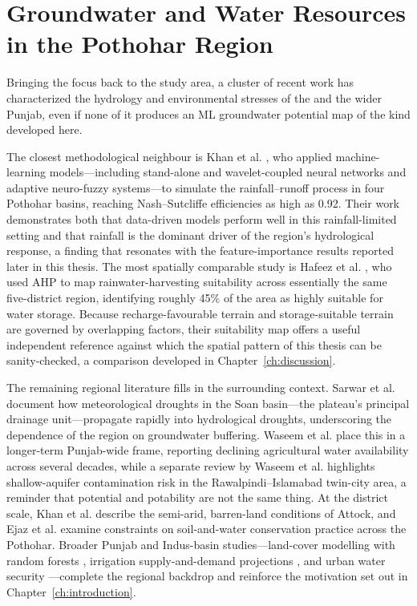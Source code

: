\section{Groundwater and Water Resources in the Pothohar Region}
\label{sec:lit_regional}

Bringing the focus back to the study area, a cluster of recent work has
characterized the hydrology and environmental stresses of the \studyarea{} and
the wider Punjab, even if none of it produces an ML groundwater potential map of
the kind developed here.

The closest methodological neighbour is Khan et al. \cite{khan2023rainfallrunoff},
who applied machine-learning models---including stand-alone and wavelet-coupled
neural networks and adaptive neuro-fuzzy systems---to simulate the
rainfall--runoff process in four Pothohar basins, reaching Nash--Sutcliffe
efficiencies as high as 0.92. Their work demonstrates both that data-driven
models perform well in this rainfall-limited setting and that rainfall is the
dominant driver of the region's hydrological response, a finding that resonates
with the feature-importance results reported later in this thesis. The most
spatially comparable study is Hafeez et al. \cite{hafeez2025rwh}, who used AHP to
map rainwater-harvesting suitability across essentially the same five-district
region, identifying roughly 45\% of the area as highly suitable for water storage.
Because recharge-favourable terrain and storage-suitable terrain are governed by
overlapping factors, their suitability map offers a useful independent reference
against which the spatial pattern of this thesis can be sanity-checked, a
comparison developed in Chapter~\ref{ch:discussion}.

The remaining regional literature fills in the surrounding context. Sarwar et al.
\cite{sarwar2022soandrought} document how meteorological droughts in the Soan
basin---the plateau's principal drainage unit---propagate rapidly into
hydrological droughts, underscoring the dependence of the region on groundwater
buffering. Waseem et al. \cite{waseem2022drought} place this in a longer-term
Punjab-wide frame, reporting declining agricultural water availability across
several decades, while a separate review by Waseem et al.
\cite{waseem2024waterquality} highlights shallow-aquifer contamination risk in the
Rawalpindi--Islamabad twin-city area, a reminder that potential and potability are
not the same thing. At the district scale, Khan et al. \cite{khan2024afforestation}
describe the semi-arid, barren-land conditions of Attock, and Ejaz et al.
\cite{ejaz2023soilwater} examine constraints on soil-and-water conservation
practice across the Pothohar. Broader Punjab and Indus-basin studies---land-cover
modelling with random forests \cite{asif2023lulc}, irrigation supply-and-demand
projections \cite{ahmed2021indusbasin}, and urban water security
\cite{kamran2024watersecurity}---complete the regional backdrop and reinforce the
motivation set out in Chapter~\ref{ch:introduction}.

